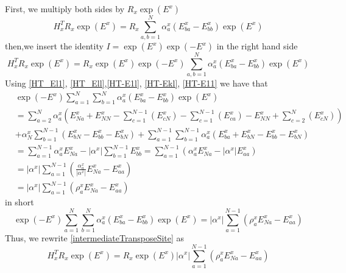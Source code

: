 \documentclass[10pt]{article}
\numberwithin{equation}{section}
\numberwithin{equation}{subsection}
\begin{document}
First, we multiply both sides by $R_{x}\exp{(E^{x})}$
\begin{equation}
    H_{x}^{T}R_{x}\exp{(E^{x})}=R_{x}\sum_{a,b =1}^{N}\alpha_{a}^{x}\left(E_{b a}^{x}-E_{bb}^{x}\right)\exp{(E^{x})}
\end{equation}
then,we insert the identity $I=\exp{(E^{x})}\exp{(-E^{x})}$ in the right hand side
\begin{equation}\label{intermediateTransposeSite}
H_{x}^{T}R_{x}\exp{(E^{x})}=R_{x}\exp{(E^{x})}\exp{(-E^{x})}\sum_{a,b=1}^{N}\alpha_{a}^{x}\left(E_{b a}^{x}-E_{bb}^{x}\right)\exp{(E^{x})}
\end{equation}
 Using \eqref{HT_El1}, \eqref{HT_Ell},\eqref{HT-E1l}, \eqref{HT-Ekl}, \eqref{HT-E11} we have that 
\begin{align}
    &\exp{(-E^{x})}\sum_{a=1}^{N}\sum_{b=1}^{N}\alpha_{a}^{x}\left(E_{b a}^{x}-E_{bb}^{x}\right)\exp{(E^{x})}\nonumber
    \\&=\nonumber
    \sum_{a=2}^{N}\alpha_{a}^{x}\left(E_{Na}^{x}+E_{NN}^{x}-\sum_{c=1}^{N-1}(E_{cN}^{x})-\sum_{c=1}^{N-1}(E_{ca}^{x})-E_{NN}^{x}+
    \sum_{c=2}^{N}(E_{cN}^{x})\right)
    \\&+\nonumber
    \alpha_{N}^{x}\sum_{b=1}^{N-1}\left(E_{bN}^{x}-E_{bb}^{x}-E_{bN}^{x}\right)+\sum_{a=1}^{N-1}\sum_{b=1}^{N-1}\alpha_{a}^{x}\left(E_{ba}^{x}+E_{bN}^{x}-E_{bb}^{x}-E_{bN}^{x}\right)
    \\&=\nonumber
    \sum_{a=1}^{N-1}\alpha_{a}^{x}E_{Na}^{x}-|\alpha^{x}|\sum_{b=1}^{N-1}E_{bb}^{x}=
    \sum_{a=1}^{N-1}\left(\alpha_{a}^{x}E_{Na}^{x}-|\alpha^{x}|E_{aa}^{x}\right)
    \\&=\nonumber
    |\alpha^{x}|\sum_{a=1}^{N-1}\left(\frac{\alpha_{a}^{x}}{|\alpha^{x}|}E_{Na}^{x}-E_{aa}^{x}\right)
    \\&=
    |\alpha^{x}|\sum_{a=1}^{N-1}\left(\rho_{a}^{x}E_{Na}^{x}-E_{aa}^{x}\right)
 \end{align}
in short
\begin{equation}\label{HadTransfBoundary}
\exp{(-E^{x})}\sum_{a=1}^{N}\sum_{b=1}^{N}\alpha_{a}^{x}\left(E_{b a}^{x}-E_{bb}^{x}\right)\exp{(E^{x})}=	|\alpha^{x}|\sum_{a=1}^{N-1}\left(\rho_{a}^{x}E_{Na}^{x}-E_{aa}^{x}\right)
\end{equation}
Thus, we rewrite \eqref{intermediateTransposeSite} as
\begin{equation}\label{siteHadamardI}
H_{x}^{T}R_{x}\exp{(E^{x})}=R_{x}\exp{(E^{x})}|\alpha^{x}|\sum_{a=1}^{N-1}\left(\rho_{a}^{x}E_{Na}^{x}-E_{aa}^{x}\right)
\end{equation}
\end{document}
